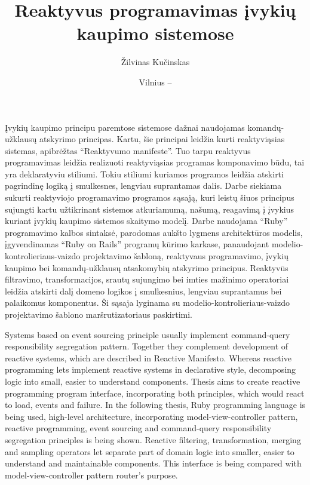 \documentclass{VUMIFPSmagistrinis}
\title{Reaktyvus programavimas įvykių kaupimo sistemose}
\author{Žilvinas Kučinskas}
\date{Vilnius – \the\year}
\begin{document}
\maketitle



Įvykių kaupimo principu paremtose sistemose dažnai naudojamas komandų-užklausų atskyrimo principas. Kartu, šie principai leidžia kurti reaktyviąsias sistemas, apibrėžtas ``Reaktyvumo manifeste''. Tuo tarpu reaktyvus programavimas leidžia realizuoti reaktyviąsias programas komponavimo būdu, tai yra deklaratyviu stiliumi. Tokiu stiliumi kuriamos programos leidžia atskirti pagrindinę logiką į smulkesnes, lengviau suprantamas dalis. Darbe siekiama sukurti reaktyviojo programavimo programos sąsają, kuri leistų šiuos principus sujungti kartu užtikrinant sistemos atkuriamumą, našumą, reagavimą į įvykius kuriant įvykių kaupimo sistemos skaitymo modelį. Darbe naudojama ``Ruby'' programavimo kalbos sintaksė, parodomas aukšto lygmens architektūros modelis, įgyvendinamas ``Ruby on Rails'' programų kūrimo karkase, panaudojant modelio-kontrolieriaus-vaizdo projektavimo šabloną, reaktyvaus programavimo, įvykių kaupimo bei komandų-užklausų atsakomybių atskyrimo principus. Reaktyvūs filtravimo, transformacijos, srautų sujungimo bei imties mažinimo operatoriai leidžia atskirti dalį domeno logikos į smulkesnius, lengviau suprantamus bei palaikomus komponentus. Ši sąsaja lyginama su modelio-kontrolieriaus-vaizdo projektavimo šablono maršrutizatoriaus paskirtimi.



Systems based on event sourcing principle usually implement command-query responsibility segregation pattern. Together they complement development of reactive systems, which are described in Reactive Manifesto. Whereas reactive programming lets implement reactive systems in declarative style, decomposing logic into small, easier to understand components. Thesis aims to create reactive programming program interface, incorporating both principles, which would react to load, events and failure. In the following thesis, Ruby programming language is being used, high-level architecture, incorporating model-view-controller pattern, reactive programming, event sourcing and command-query responsibility segregation principles is being shown. Reactive filtering, transformation, merging and sampling operators let separate part of domain logic into smaller, easier to understand and maintainable components. This interface is being compared with model-view-controller pattern router's purpose.
\end{document}

